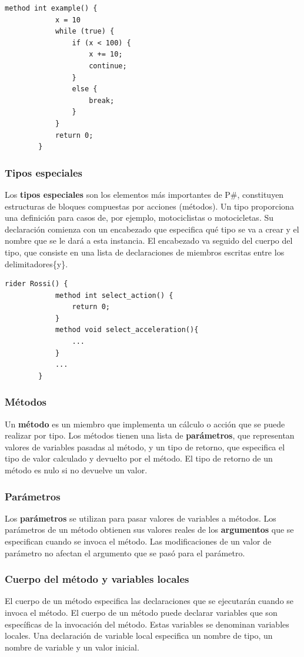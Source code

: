 \documentclass[12pt, letterpaper,spanish]{article}
\theoremstyle{definition}
\theoremstyle{remark}
\begin{document}
	\begin{lstlisting}[language={PySharp}]
		method int example() {
			x = 10
			while (true) {				
				if (x < 100) {
					x += 10;
					continue;
				}
				else {
					break;
				}
			}
			return 0;
		}
	\end{lstlisting}
	
	\subsubsection{Tipos especiales}
	Los \textbf{tipos especiales} son los elementos más importantes de P\#, constituyen estructuras de bloques compuestas por acciones (métodos). Un tipo proporciona una definición para casos de, por ejemplo, motociclistas o motocicletas. Su declaración comienza con un encabezado que especifica qué tipo se va a crear y el nombre que se le dará a esta instancia. El encabezado va seguido del cuerpo del tipo, que consiste en una lista de declaraciones de miembros escritas entre los delimitadores\{y\}.
	
	\begin{lstlisting}[language={PySharp}]
		rider Rossi() {
			method int select_action() {    
				return 0;
			}
			method void select_acceleration(){
				...
			}
			...
		}
	\end{lstlisting}
	\subsubsection{Métodos}
	Un \textbf{método} es un miembro que implementa un cálculo o acción que se puede realizar por tipo. Los métodos tienen una lista de \textbf{parámetros}, que representan valores de variables pasadas al método, y un tipo de retorno, que especifica el tipo de valor calculado y devuelto por el método. El tipo de retorno de un método es nulo si no devuelve un valor.
	
	\subsubsection{Parámetros}
	Los \textbf{parámetros} se utilizan para pasar valores de variables a métodos. Los parámetros de un método obtienen sus valores reales de los \textbf{argumentos} que se especifican cuando se invoca el método. Las modificaciones de un valor de parámetro no afectan el argumento que se pasó para el parámetro.
	
	\subsubsection{Cuerpo del método y variables locales}
	El cuerpo de un método especifica las declaraciones que se ejecutarán cuando se invoca el método. El cuerpo de un método puede declarar variables que son específicas de la invocación del método. Estas variables se denominan variables locales. Una declaración de variable local especifica un nombre de tipo, un nombre de variable y un valor inicial.
	
\end{document}
